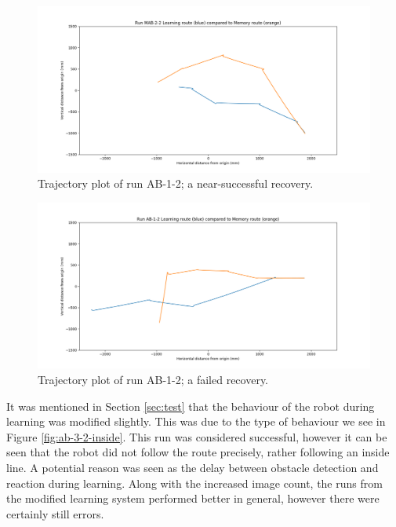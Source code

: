 \documentclass[a4paper,12pt,twoside,openright]{article}
\begin{document}
\begin{figure}
 \centering
  \includegraphics[width=\textwidth]{MAB-2-2}
  \caption{
    \label{fig:mab-2-2-succ} Trajectory plot of run AB-1-2; a near-successful recovery.
  }
\end{figure}


\begin{figure}
 \centering
  \includegraphics[width=\textwidth]{AB-1-2}
  \caption{
    \label{fig:ab-1-2-fail} Trajectory plot of run AB-1-2; a failed recovery.
  }
\end{figure}

It was mentioned in Section \ref{sec:test} that the behaviour of the robot during learning was modified slightly. This
was due to the type of behaviour we see in Figure \ref{fig:ab-3-2-inside}. This run was considered successful, however it can be seen
that the robot did not follow the route precisely, rather following an inside line. A potential reason was seen as the
delay between obstacle detection and reaction during learning. Along with the increased image count, the runs from
the modified learning system performed better in general, however there were certainly still errors.
\newline
\end{document}
